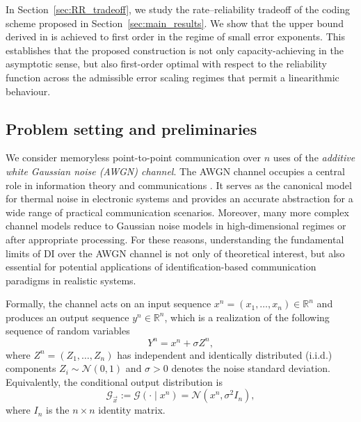 \documentclass[10pt,conference]{IEEEtran}
\newcommand{\1}{\mathds{1}}
\newcommand{\cG}{\mathcal{G}}
\begin{document}
In Section~\ref{sec:RR_tradeoff}, we study the rate–reliability tradeoff of the coding scheme proposed in Section~\ref{sec:main_results}. We show that the upper bound derived in \cite{RRGauss-arXiv} is achieved to first order in the regime of small error exponents. This establishes that the proposed construction is not only capacity-achieving in the asymptotic sense, but also first-order optimal with respect to the reliability function across the admissible error scaling regimes that permit a linearithmic behaviour.







\subsection{Problem setting and preliminaries}\label{ssec:setting}
We consider memoryless point-to-point communication over $n$ uses of the 
\emph{additive white Gaussian noise (AWGN) channel}. The AWGN channel occupies a central role in information theory and communications \cite{AWGN_IT, AWGN_radio, AWGN_wireless}. It serves as the canonical model for thermal noise in electronic systems and provides an accurate abstraction for a wide range of practical communication scenarios. Moreover, many more complex channel models reduce to Gaussian noise models in high-dimensional regimes or after appropriate processing. For these reasons, understanding the fundamental limits of DI over the AWGN channel is not only of theoretical interest, but also essential for potential applications of identification-based communication paradigms in realistic systems.


Formally, the channel acts on an input sequence $x^n=(x_1,\dots,x_n)\in\mathbb{R}^n$ and produces an output sequence $y^n\in\mathbb{R}^n$, which is a realization of the following sequence of random variables
\begin{equation}\label{eq:AWGN}
Y^n = x^n + \sigma Z^n,
\end{equation}
where $Z^n=(Z_1,\dots,Z_n)$ has independent and identically distributed (i.i.d.) components $Z_i \sim \mathcal{N}(0,1)$ and $\sigma>0$ denotes the noise standard deviation. Equivalently, the conditional output distribution is
\begin{equation}\label{eq:output_distr}
 \cG_{\vec{x}}:=\mathcal{G}(\cdot \mid x^n) = \mathcal{N}(x^n,\sigma^2 I_n),
\end{equation}
where $I_n$ is the $n\times n$ identity matrix.
\end{document}
